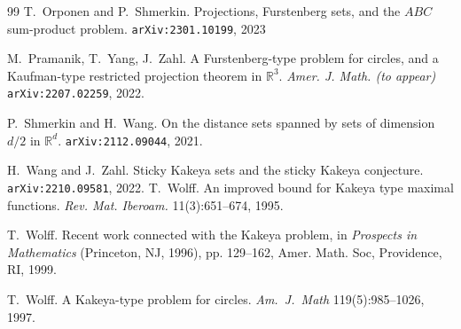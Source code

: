 \documentclass[letterpaper, reqno,11pt]{article}
\numberwithin{equation}{section}
\numberwithin{thm}{section}
\theoremstyle{remark}
\begin{document}
\begin{thebibliography}{99}
 T.~Orponen and P.~Shmerkin. Projections, Furstenberg sets, and the $ABC$ sum-product problem. {\tt arXiv:2301.10199}, 2023

 M.~Pramanik, T.~Yang, J.~Zahl. A Furstenberg-type problem for circles, and a Kaufman-type restricted projection theorem in $\mathbb{R}^3$. \emph{Amer. J. Math. (to appear)} {\tt arXiv:2207.02259}, 2022.

 P.~Shmerkin and H.~Wang. On the distance sets  spanned by sets of dimension $d/2$ in $\mathbb{R}^d$.   {\tt arXiv:2112.09044}, 2021.

 H.~Wang and J.~Zahl. Sticky Kakeya sets and the sticky Kakeya conjecture. {\tt arXiv:2210.09581}, 2022.
%
 T.~Wolff. An improved bound for Kakeya type maximal functions. \emph{Rev. Mat. Iberoam.} 11(3):651--674, 1995.

 T.~Wolff. Recent work connected with the Kakeya problem, in \emph{Prospects in Mathematics} (Princeton, NJ, 1996), pp. 129--162, Amer. Math. Soc, Providence, RI, 1999.

 T.~Wolff. A {K}akeya-type problem for circles. \emph{Am.~J.~Math} 119(5):985--1026, 1997.
\end{thebibliography}
\end{document}
